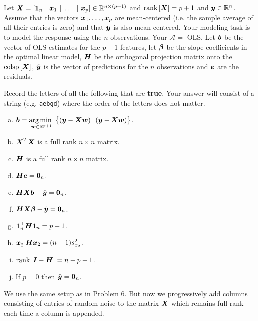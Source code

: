 \documentclass[12pt]{article}
\begin{document}
\problem [17min] Let $\boldsymbol{X} = \left[\boldsymbol{1}_n~|~\boldsymbol{x}_1~|~\ldots~|~\boldsymbol{x}_p\right] \in \mathbb{R}^{n \times (p +1)}$ and $\text{rank}\left[\boldsymbol{X}\right] = p + 1$ and $\boldsymbol{y} \in \mathbb{R}^n$. Assume that the vectors $\boldsymbol{x}_1, \ldots, \boldsymbol{x}_p$ are mean-centered (i.e. the sample average of all their entries is zero) and that $\boldsymbol{y}$ is also mean-centered. Your modeling task is to model the response using the $n$ observations. Your $\mathcal{A} =$ OLS. Let $\boldsymbol{b}$ be the vector of OLS estimates for the $p+1$ features, let $\boldsymbol{\beta}$ be the slope coefficients in the optimal linear model, $\boldsymbol{H}$ be the orthogonal projection matrix onto the $\text{colsp}\left[\boldsymbol{X}\right]$, $\hat{\boldsymbol{y}}$ is the vector of predictions for the $n$ observations and $\boldsymbol{e}$ are the residuals.

\benum

 Record the letters of all the following that are \textbf{true}. Your answer will consist of a string (e.g. \texttt{aebgd}) where the order of the letters does not matter.

\begin{enumerate}[(a)]
\item $\boldsymbol{b} = \displaystyle\operatorname*{arg\,min~}_{\boldsymbol{w} \in \mathbb{R}^{p + 1}}\left\{(\boldsymbol{y} - \boldsymbol{X}\boldsymbol{w})^\top (\boldsymbol{y} - \boldsymbol{X}\boldsymbol{w})\right\}$.
\item $\boldsymbol{X}^T\boldsymbol{X}$ is a full rank $n \times n$ matrix.
\item $\boldsymbol{H}$ is a full rank $n \times n$ matrix.
\item $\boldsymbol{H}\boldsymbol{e} = \boldsymbol{0}_n$.
\item $\boldsymbol{H}\boldsymbol{X}\boldsymbol{b} - \hat{\boldsymbol{y}} = \boldsymbol{0}_n$.
\item $\boldsymbol{H}\boldsymbol{X}\boldsymbol{\beta} - \hat{\boldsymbol{y}} = \boldsymbol{0}_n$.
\item $\boldsymbol{1}_n^\top\boldsymbol{H}\boldsymbol{1}_n = p + 1$.
\item $\boldsymbol{x}_2^\top\boldsymbol{H}\boldsymbol{x}_2 = (n - 1)s^2_{x_2}$.
\item $\text{rank}\left[\boldsymbol{I} - \boldsymbol{H}\right] = n - p - 1$.
\item If $p = 0$ then $\hat{\boldsymbol{y}} = \boldsymbol{0}_n$.
\end{enumerate}
\eenum\pagebreak



\problem [13min] We use the same setup as in Problem 6.  But now we progressively add columns consisting of entries of random noise to the matrix $\boldsymbol{X}$ which remains full rank each time a column is appended.
\end{document}
